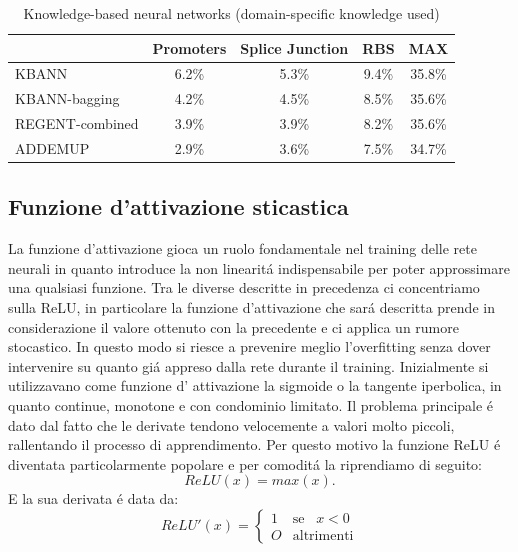 \documentclass[a4paper,10pt]{article}
\begin{document}
  \begin{table}[h]\caption{Knowledge-based neural networks (domain-specific knowledge used)} \label{KnowledgeTab}
   \centering
   \begin{tabular}[h]{|l|c|c|c|c|}
    \hline
       & Promoters & Splice Junction & RBS & MAX \\ \hline
    KBANN & 6.2\% & 5.3\% & 9.4\% & 35.8\% \\ 
    KBANN-bagging & 4.2\% & 4.5\% & 8.5\% & 35.6\% \\
    REGENT-combined & 3.9\% & 3.9\% & 8.2\% & 35.6\% \\
    ADDEMUP & 2.9\% & 3.6\% & 7.5\% & 34.7\% \\ \hline
   \end{tabular}
  \end{table}


 \subsection{Funzione d'attivazione sticastica}
 La funzione d'attivazione gioca un ruolo fondamentale nel training delle rete neurali in quanto introduce la non linearit\'a indispensabile per poter approssimare una qualsiasi funzione. Tra le diverse descritte in precedenza ci concentriamo sulla ReLU, in particolare la funzione d'attivazione che sar\'a descritta prende in considerazione il valore ottenuto con la precedente e ci applica un rumore stocastico. In questo modo si riesce a prevenire meglio l'overfitting senza dover intervenire su quanto gi\'a appreso dalla rete durante il training. 
 Inizialmente si utilizzavano come funzione d' attivazione la sigmoide o la tangente iperbolica, in quanto continue, monotone e con condominio limitato. Il problema principale \'e dato dal fatto che le derivate tendono velocemente a valori molto piccoli, rallentando il processo di apprendimento. Per questo motivo la funzione ReLU \'e diventata particolarmente popolare e per comodit\'a la riprendiamo di seguito:
 \begin{equation} 
  ReLU\left(x\right) = max\left(x\right). 
 \end{equation} 
 E la sua derivata  \'e data da:
 \begin{equation} 
  ReLU'\left(x\right) = \begin{cases} 
     1 & \mbox{se} \;\;\; x < 0 \\
     O & \mbox{altrimenti} 
 \end{cases} 
 \end{equation} 
\end{document}
